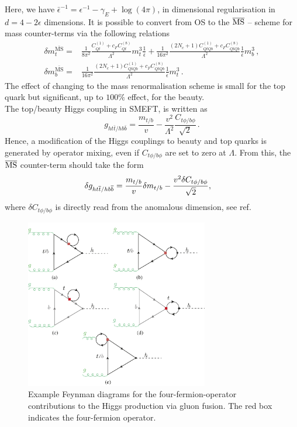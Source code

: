 	Here, we have $\bar{\epsilon}^{-1} = \epsilon^{-1}- \gamma_E +\log(4 \pi)$, in dimensional regularisation in $d=4-2\epsilon$ dimensions. 
	It is possible to convert from OS to the $\MSbar$ -- scheme for mass counter-terms via the following relations
	\begin{align}
		\delta m_t^{\bar{\text{MS}}} =&\frac{1}{8 \pi^2} \frac{C_{Qt}^{(1)}+c_F C_{Qt}^{(8)}}{\Lambda^2}m_t^3\frac{1}{\bar{\epsilon}}+ \frac{1}{16 \pi^2}  \frac{(2 N_c+1) C_{QtQb}^{(1)}+c_F C_{QtQb}^{(8)}}{\Lambda^2}   \frac{1}{\bar{\epsilon}}  m_b^3\,,  \\
		\delta m_b^{\bar{\text{MS}}}=&\frac{1}{16 \pi^2} \frac{(2 N_c+1)C_{QtQb}^{(1)}+c_F C_{QtQb}^{(8)}}{\Lambda^2}\frac{1}{\bar{\epsilon}} m_t^3\,.
	\end{align} 
	The effect of changing to the mass renormalisation scheme is small for the top quark but significant, up to $100\%$ effect, for the beauty. \\
	The top/beauty Higgs coupling in SMEFT, is written as
	\begin{equation}
		g_{ht\bar{t}/hb\bar{b}}=\frac{m_{t/b}}{v}-\frac{v^2}{\Lambda^2}\frac{C_{t\phi/b\phi}}{\sqrt{2}}\,.
	\end{equation}
	Hence, a modification of the Higgs couplings to beauty and top quarks is generated by operator mixing, even if $C_{t\phi/b\phi}$ are set to zero at $\Lambda$. From this, the $\MSbar$ counter-term should take the form 
	\begin{align}
		\delta	g_{ht\bar{t}/hb\bar{b}} &=  {m_{t/b}\over v} \delta{m_{t/b}} -{v^2 \delta{C_{t\phi/b\phi}}\over \sqrt{2} },
	\end{align}
	where $\delta{C_{t\phi/b\phi}}$ is directly read from the anomalous dimension, see ref.~\cite{Alonso:2013hga}
	\begin{figure}[h!]
		\begin{center}
			\includegraphics[width=8cm]{fig/ggF-4F_NLO.pdf}
			\caption{Example Feynman diagrams for the four-fermion-operator contributions to the Higgs production via gluon fusion. The red box indicates the four-fermion operator.\label{fig:ggh} }
		\end{center}
		\vspace{-1.5 cm}
	\end{figure}
